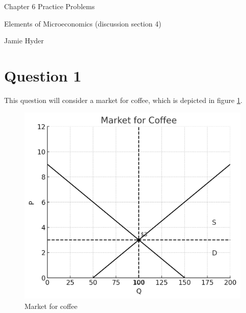 \documentclass[12pt]{article}
\begin{document}
\begin{center}
\Large Chapter 6 Practice Problems

\medskip

\normalsize Elements of Microeconomics (discussion section 4)

\medskip

\small Jamie Hyder
\end{center}

\section*{Question 1}
This question will consider a market for coffee, which is depicted in figure \ref{fig:coffee_eq}.

\begin{figure}[h]
    \centering
    \includegraphics[width=.6\textwidth]{output-2.png}
    \caption{Market for coffee}
    \label{fig:coffee_eq}
\end{figure}
\end{document}
